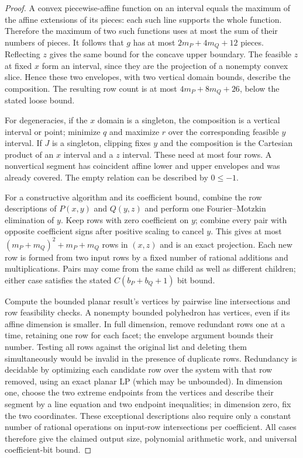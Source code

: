 \begin{proof}
A convex piecewise-affine function on an interval equals the maximum
of the affine extensions of its pieces: each such line supports the
whole function. Therefore the maximum of two such functions uses at
most the sum of their numbers of pieces. It follows that $g$ has at
most $2m_P+4m_Q+12$ pieces. Reflecting $z$ gives the same bound for
the concave upper boundary. The feasible $z$ at fixed $x$ form an
interval, since they are the projection of a nonempty convex slice.
Hence these two envelopes, with two vertical domain bounds, describe
the composition. The resulting row count is at most
$4m_P+8m_Q+26$, below the stated loose bound.

For degeneracies, if the $x$ domain is a singleton, the composition
is a vertical interval or point; minimize $q$ and maximize $r$ over
the corresponding feasible $y$ interval. If $J$ is a singleton,
clipping fixes $y$ and the composition is the Cartesian product of
an $x$ interval and a $z$ interval. These need at most four rows.
A nonvertical segment has coincident affine lower and upper envelopes
and was already covered. The empty relation can be described by
$0\le-1$.

For a constructive algorithm and its coefficient bound, combine the
row descriptions of $P(x,y)$ and $Q(y,z)$ and perform one
Fourier--Motzkin elimination of $y$. Keep rows with zero coefficient
on $y$; combine every pair with opposite coefficient signs after
positive scaling to cancel $y$. This gives at most
$(m_P+m_Q)^2+m_P+m_Q$ rows in $(x,z)$ and is an exact projection.
Each new row is formed from two input rows by a fixed number of
rational additions and multiplications. Pairs may come from the
same child as well as different children; either case satisfies the
stated $C(b_P+b_Q+1)$ bit bound.

Compute the bounded planar result's vertices by pairwise line
intersections and row feasibility checks. A nonempty bounded
polyhedron has vertices, even if its affine dimension is smaller.
In full dimension, remove redundant rows one at a time, retaining one
row for each facet; the envelope argument bounds their number. Testing
all rows against the original list and deleting them simultaneously
would be invalid in the presence of duplicate rows. Redundancy is
decidable by optimizing each candidate row over the system with that
row removed, using an exact planar LP (which may be unbounded). In dimension one, choose the two extreme endpoints from
the vertices and describe their segment by a line equation and two
endpoint inequalities; in dimension zero, fix the two coordinates.
These exceptional descriptions also require only a constant number
of rational operations on input-row intersections per coefficient.
All cases therefore give the claimed output size, polynomial
arithmetic work, and universal coefficient-bit bound.
\end{proof}

